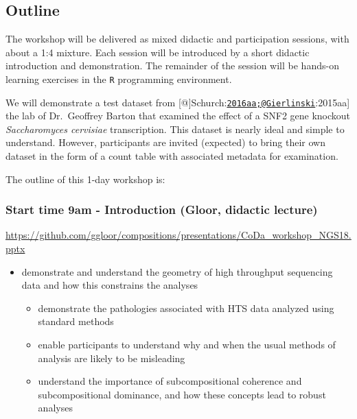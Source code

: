 \documentclass[twocolumn]{article}
\providecommand{\tightlist}{%
  \setlength{\itemsep}{0pt}\setlength{\parskip}{0pt}}
\begin{document}
\hypertarget{outline}{%
\subsection{Outline}\label{outline}}

The workshop will be delivered as mixed didactic and participation
sessions, with about a 1:4 mixture. Each session will be introduced by a
short didactic introduction and demonstration. The remainder of the
session will be hands-on learning exercises in the \texttt{R}
programming environment.

We will demonstrate a test dataset from
{[}@{]}Schurch:\href{mailto:2016aa;@Gierlinski}{\nolinkurl{2016aa;@Gierlinski}}:2015aa{]}
the lab of Dr.~Geoffrey Barton that examined the effect of a SNF2 gene
knockout \emph{Saccharomyces cervisiae} transcription. This dataset is
nearly ideal and simple to understand. However, participants are invited
(expected) to bring their own dataset in the form of a count table with
associated metadata for examination.

The outline of this 1-day workshop is:

\hypertarget{start-time-9am---introduction-gloor-didactic-lecture}{%
\subsubsection{Start time 9am - Introduction (Gloor, didactic
lecture)}\label{start-time-9am---introduction-gloor-didactic-lecture}}

\url{https://github.com/ggloor/compositions/presentations/CoDa_workshop_NGS18.pptx}

\begin{itemize}
\tightlist
\item
  demonstrate and understand the geometry of high throughput sequencing
  data and how this constrains the analyses

  \begin{itemize}
  \tightlist
  \item
    demonstrate the pathologies associated with HTS data analyzed using
    standard methods
  \item
    enable participants to understand why and when the usual methods of
    analysis are likely to be misleading
  \item
    understand the importance of subcompositional coherence and
    subcompositional dominance, and how these concepts lead to robust
    analyses
  \end{itemize}
\end{itemize}
\end{document}
